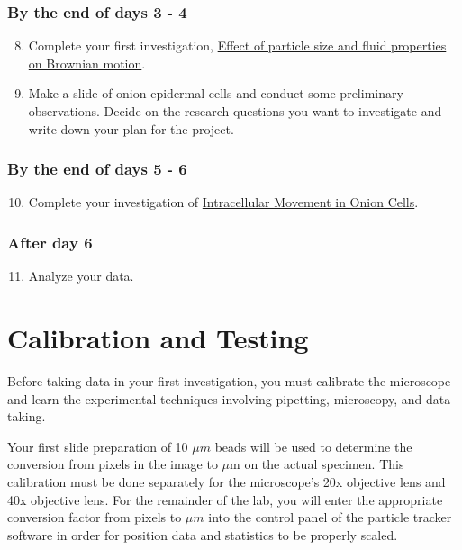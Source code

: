 \documentclass{../lab}
\begin{document}
\subsubsection{By the end of days 3 - 4}

\begin{enumerate}
    \setcounter{enumi}{7}
    \item Complete your first investigation, \hyperref[sec:InvestigationI]{Effect of particle size and fluid properties on Brownian motion}.

    \item Make a slide of onion epidermal cells and conduct some preliminary observations. Decide on the research questions you want to investigate and write down your plan for the project.
\end{enumerate}

\subsubsection{By the end of days 5 - 6}

\begin{enumerate}
    \setcounter{enumi}{9}
    \item Complete your investigation of \hyperref[sec:InvestigationII]{Intracellular Movement in Onion Cells}.
\end{enumerate}

\subsubsection{After day 6}

\begin{enumerate}
    \setcounter{enumi}{10}
    \item Analyze your data.
\end{enumerate}

\section{Calibration and Testing}
\label{sec:CalibrationAndTesting}

Before taking data in your first investigation, you must calibrate the microscope and learn the experimental techniques involving pipetting, microscopy, and data-taking.

Your first slide preparation of 10 $\mu m$ beads will be used to determine the conversion from pixels in the image to $\mu$m on the actual specimen. This calibration must be done separately for the microscope's 20x objective lens and 40x objective lens. For the remainder of the lab, you will enter the appropriate conversion factor from pixels to $\mu m$ into the control panel of the particle tracker software in order for position data and statistics to be properly scaled.
\end{document}
